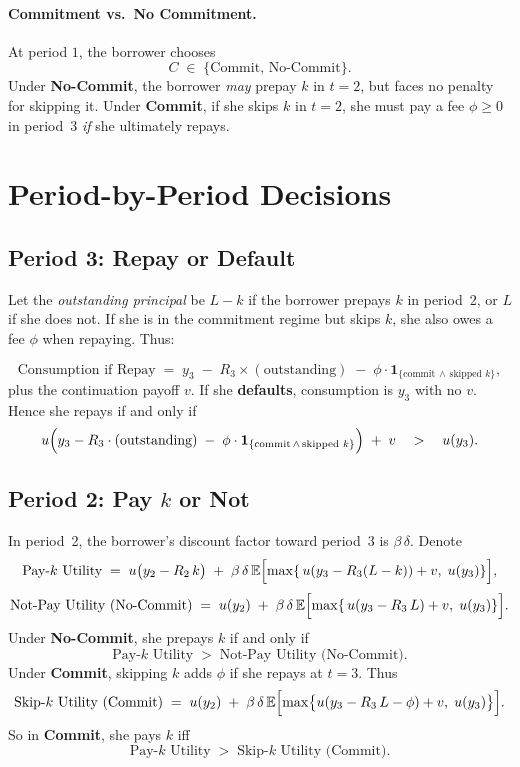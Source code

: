 \documentclass[11pt]{article}
\begin{document}
\paragraph{Commitment vs.\ No Commitment.}
At period \(1\), the borrower chooses
\[
C 
\;\in\; 
\{\text{Commit},\, \text{No-Commit}\}.
\]
Under \textbf{No-Commit}, the borrower \emph{may} prepay \(k\) in \(t=2\), but faces no penalty for skipping it. Under \textbf{Commit}, if she skips \(k\) in \(t=2\), she must pay a fee \(\phi \ge 0\) in period~3 \emph{if} she ultimately repays.  

\section{Period-by-Period Decisions}

\subsection{Period 3: Repay or Default}

Let the \emph{outstanding principal} be \(L-k\) if the borrower prepays \(k\) in period~2, or \(L\) if she does not. If she is in the commitment regime but skips \(k\), she also owes a fee \(\phi\) when repaying. Thus:

\[
\text{Consumption if Repay} 
\;=\; 
y_3 \;-\; R_3 \times (\text{outstanding}) 
\;-\; 
\phi \cdot \mathbf{1}_{\{\text{commit} \,\wedge\, \text{skipped }k\}},
\]
plus the continuation payoff \(v\). If she \textbf{defaults}, consumption is \(y_3\) with no \(v\). Hence she repays if and only if
\[
u\Bigl(
  y_3 - R_3 \cdot (\text{outstanding})
  \;-\; 
  \phi \cdot \mathbf{1}_{\{\text{commit}\,\wedge\,\text{skipped }k\}}
\Bigr)
\;+\; v
\quad>\quad
u(y_3).
\]

\subsection{Period 2: Pay $k$ or Not}

In period~2, the borrower’s discount factor toward period~3 is \(\beta\,\delta\).  Denote
\[
\text{Pay-$k$ Utility} 
\;=\; 
u\bigl(y_2 - R_2\,k\bigr)
\;+\;
\beta\,\delta\,
\mathbb{E}\Bigl[
  \max\{\,u(y_3 - R_3(L - k)) + v,\;u(y_3)\}
\Bigr],
\]
\[
\text{Not-Pay Utility (No-Commit)} 
\;=\;
u(y_2)
\;+\;
\beta\,\delta\,
\mathbb{E}\Bigl[
  \max\{\,u(y_3 - R_3\,L) + v,\;u(y_3)\}
\Bigr].
\]
Under \textbf{No-Commit}, she prepays \(k\) if and only if
\[
\text{Pay-$k$ Utility} 
\;>\;
\text{Not-Pay Utility (No-Commit)}.
\]
Under \textbf{Commit}, skipping \(k\) adds \(\phi\) if she repays at \(t=3\). Thus
\[
\text{Skip-$k$ Utility (Commit)}
\;=\;
u(y_2)
\;+\;
\beta\,\delta\,
\mathbb{E}\Bigl[
  \max\bigl\{
    u(y_3 - R_3\,L - \phi) + v,\;
    u(y_3)
  \bigr\}
\Bigr].
\]
So in \textbf{Commit}, she pays \(k\) iff
\[
\text{Pay-$k$ Utility} 
\;>\;
\text{Skip-$k$ Utility (Commit)}.
\]
\end{document}
